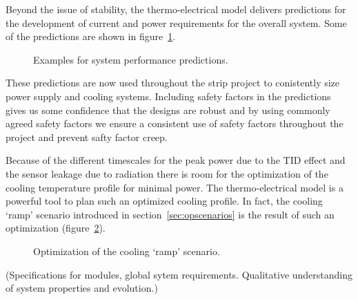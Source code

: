 Beyond the issue of stability, the thermo-electrical model delivers predictions for the development of current and power requirements for the overall system. Some of the predictions are shown in figure~\ref{fig:systemperformance}. 

\begin{figure}[ht]
\centering
\caption{Examples for system performance predictions.}
\label{fig:systemperformance}
\end{figure}

These predictions are now used throughout the strip project to conistently size power supply and cooling systems. Including safety factors in the predictions gives us some confidence that the designs are robust and by using commonly agreed safety factors we ensure a consistent use of safety factors throughout the project and prevent safty factor creep.  

Because of the different timescales for the peak power due to the TID effect and the sensor leakage due to radiation there is room for the optimization of the cooling temperature profile for minimal power. The thermo-electrical model is a powerful tool to plan such an optimized cooling profile. In fact, the cooling `ramp' scenario introduced in section~\ref{sec:opscenarios} is the result of such an optimization (figure~\ref{fig:rampoptimization}).

\begin{figure}[ht]
\centering
\caption{Optimization of the cooling `ramp' scenario.}
\label{fig:rampoptimization}
\end{figure}

(Specifications for modules, global sytem requirements.
Qualitative understanding of system properties and evolution.)

